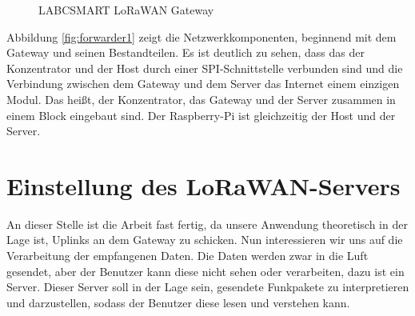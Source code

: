 \begin{figure}[h!]
	\centering
	\caption{LABCSMART LoRaWAN Gateway}
\end{figure}


Abbildung \ref{fig:forwarder1} zeigt die Netzwerkkomponenten, beginnend
mit dem Gateway und seinen Bestandteilen. Es ist deutlich zu sehen, dass
das der Konzentrator und der Host durch einer SPI-Schnittstelle verbunden
sind und die Verbindung zwischen dem Gateway und dem Server das Internet
einem einzigen Modul. Das hei\ss{}t, der Konzentrator, das Gateway und der
Server zusammen in einem Block eingebaut sind. Der Raspberry-Pi ist
gleichzeitig der Host und der Server. 

\section{Einstellung des LoRaWAN-Servers}\label{server}

An dieser Stelle ist die Arbeit fast fertig, da unsere Anwendung
theoretisch in der Lage ist, Uplinks an dem Gateway zu schicken. Nun
interessieren wir uns auf die Verarbeitung der empfangenen Daten. Die
Daten werden zwar in die Luft gesendet, aber der Benutzer kann diese
nicht sehen oder verarbeiten, dazu ist ein Server. Dieser Server soll in
der Lage sein, gesendete Funkpakete zu interpretieren und darzustellen,
sodass der Benutzer diese lesen und verstehen kann. 

